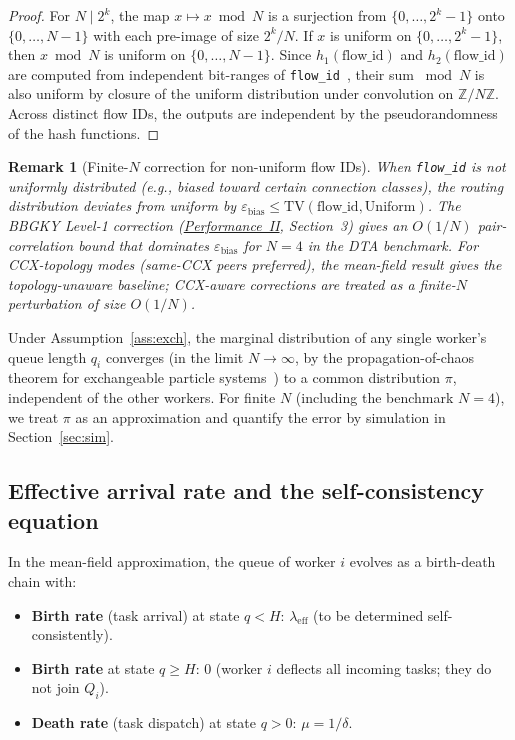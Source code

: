 \documentclass[11pt,a4paper]{article}
\newtheorem{remark}{Remark}[section]
\newcommand{\code}[1]{\texttt{#1}}
\begin{document}
\begin{proof}
For $N \mid 2^k$, the map $x \mapsto x \bmod N$ is a surjection from
$\{0,\ldots,2^k-1\}$ onto $\{0,\ldots,N-1\}$ with each pre-image of size $2^k/N$.
If $x$ is uniform on $\{0,\ldots,2^k-1\}$, then $x \bmod N$ is uniform on
$\{0,\ldots,N-1\}$.  Since $h_1(\mathrm{flow\_id})$ and $h_2(\mathrm{flow\_id})$
are computed from independent bit-ranges of \code{flow\_id}~\cite{dtact_source},
their sum $\bmod N$ is also uniform by closure of the uniform distribution
under convolution on $\mathbb{Z}/N\mathbb{Z}$.
Across distinct flow IDs, the outputs are independent by the pseudorandomness
of the hash functions.
\end{proof}

\begin{remark}[Finite-$N$ correction for non-uniform flow IDs]
When \code{flow\_id} is \emph{not} uniformly distributed (e.g., biased
toward certain connection classes), the routing distribution deviates from
uniform by $\varepsilon_{\mathrm{bias}} \le \mathrm{TV}(\mathrm{flow\_id}, \mathrm{Uniform})$.
The BBGKY Level-1 correction (\hyperref[chap:kinetic_theory]{Performance~II},
Section~3) gives an $O(1/N)$ pair-correlation bound that dominates
$\varepsilon_{\mathrm{bias}}$ for $N=4$ in the DTA benchmark.
For CCX-topology modes (same-CCX peers preferred), the mean-field result
gives the \emph{topology-unaware} baseline; CCX-aware corrections are
treated as a finite-$N$ perturbation of size $O(1/N)$.
\end{remark}

Under Assumption~\ref{ass:exch}, the marginal distribution of any
single worker's queue length $q_i$ converges (in the limit $N \to
\infty$, by the propagation-of-chaos theorem for exchangeable
particle systems~\cite{sznitman1991}) to a common distribution
$\pi$, independent of the other workers.  For finite $N$ (including
the benchmark $N=4$), we treat $\pi$ as an approximation and
quantify the error by simulation in Section~\ref{sec:sim}.

\subsection{Effective arrival rate and the self-consistency equation}

In the mean-field approximation, the queue of worker $i$ evolves
as a birth-death chain with:
\begin{itemize}
  \item \textbf{Birth rate} (task arrival) at state $q < H$:
        $\lambda_{\text{eff}}$ (to be determined self-consistently).
  \item \textbf{Birth rate} at state $q \geq H$: $0$
        (worker $i$ deflects all incoming tasks; they do not join
        $Q_i$).
  \item \textbf{Death rate} (task dispatch) at state $q > 0$:
        $\mu = 1/\delta$.
\end{itemize}
\end{document}
